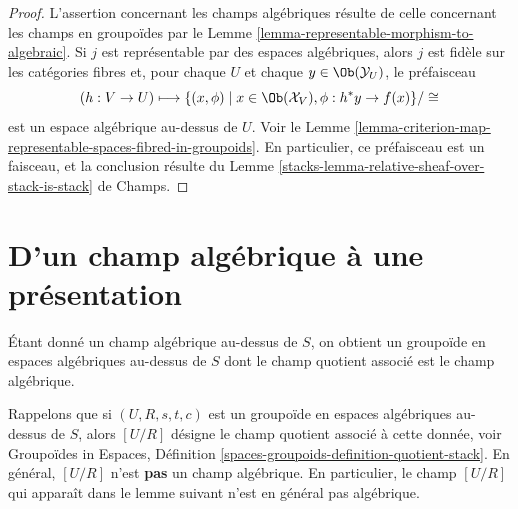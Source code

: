 \begin{proof}
L'assertion concernant les champs algébriques résulte de celle concernant les
champs en groupoïdes par le Lemme \ref{lemma-representable-morphism-to-algebraic}.
Si $j$ est représentable par des espaces algébriques, alors $j$ est
fidèle sur les catégories fibres et, pour chaque $U$ et chaque
$y \in \Ob(\mathcal{Y}_U)$, le préfaisceau
$$
(h : V \to U)
\longmapsto
\{(x, \phi) \mid x \in \Ob(\mathcal{X}_V), \phi : h^*y \to f(x)\}/\cong
$$
est un espace algébrique au-dessus de $U$. Voir le
Lemme \ref{lemma-criterion-map-representable-spaces-fibred-in-groupoids}.
En particulier, ce préfaisceau est un faisceau, et la conclusion résulte du
Lemme \ref{stacks-lemma-relative-sheaf-over-stack-is-stack} de Champs.
\end{proof}



\section{D'un champ algébrique à une présentation}
\label{section-stack-to-presentation}

\noindent
Étant donné un champ algébrique au-dessus de $S$, on obtient un groupoïde en espaces algébriques
au-dessus de $S$ dont le champ quotient associé est le champ algébrique.

\medskip\noindent
Rappelons que si $(U, R, s, t, c)$ est un groupoïde en espaces algébriques au-dessus de $S$,
alors $[U/R]$ désigne le champ quotient associé à cette donnée, voir
Groupoïdes in Espaces,
Définition \ref{spaces-groupoids-definition-quotient-stack}.
En général, $[U/R]$ n'est {\bf pas} un champ algébrique. En particulier, le
champ $[U/R]$ qui apparaît dans le lemme suivant n'est en général pas
algébrique.

